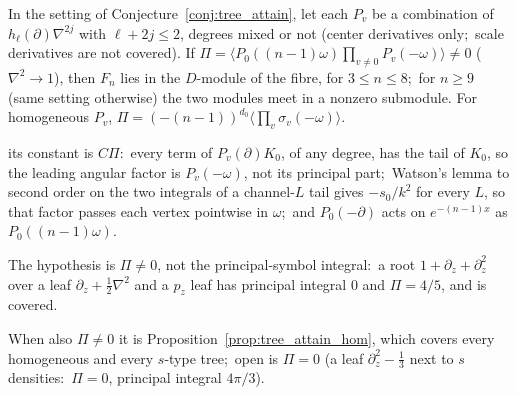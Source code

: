 \begin{proposition}
\label{prop:tree_attain_hom}
In the setting of Conjecture~\ref{conj:tree_attain}, let each $P_v$ be a
combination of $h_\ell(\partial)\nabla^{2j}$ with $\ell+2j\le2$, degrees mixed
or not (center derivatives only;\ scale derivatives are not covered).  If
$\Pi=\langle P_0((n-1)\omega)\prod_{v\neq0}P_v(-\omega)\rangle\neq0$
($\nabla^2\to1$), then $F_n$ lies in the $D$-module of the fibre, for
$3\le n\le8$;\ for $n\ge9$ (same setting otherwise) the two modules meet in a
nonzero submodule.  For homogeneous $P_v$,
$\Pi=(-(n-1))^{d_0}\langle\prod_v\sigma_v(-\omega)\rangle$.
\end{proposition}

its constant is $C\Pi$:\ every term of $P_v(\partial)K_0$, of any degree, has the
tail of $K_0$, so the leading angular factor is $P_v(-\omega)$, not its principal
part;\ Watson's lemma to second order on the two integrals of a channel-$L$ tail
gives $-s_0/k^2$ for every $L$, so that factor passes each vertex pointwise in
$\omega$;\ and $P_0(-\partial)$ acts on $e^{-(n-1)x}$ as $P_0((n-1)\omega)$.

The hypothesis is $\Pi\neq0$, not the principal-symbol integral:\ a root
$1+\partial_z+\partial_z^2$ over a leaf $\partial_z+\tfrac12\nabla^2$ and a $p_z$
leaf has principal integral $0$ and $\Pi=4/5$, and is covered.

When also $\Pi\neq0$ it is Proposition~\ref{prop:tree_attain_hom}, which covers
every homogeneous and every $s$-type tree;\ open is $\Pi=0$ (a leaf
$\partial_z^2-\tfrac13$ next to $s$ densities:\ $\Pi=0$, principal integral
$4\pi/3$).
